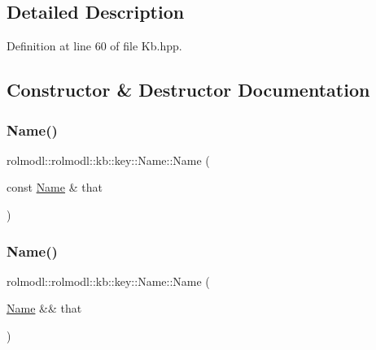 \subsection{Detailed Description}


Definition at line 60 of file Kb.\+hpp.



\subsection{Constructor \& Destructor Documentation}
\mbox{\label{structrolmodl_1_1rolmodl_1_1kb_1_1key_1_1_name_a7811719d33231a58b4f5c690c213a5f6}} 
\subsubsection{\texorpdfstring{Name()}{Name()}\hspace{0.1cm}{\footnotesize\ttfamily [1/2]}}
{\footnotesize\ttfamily rolmodl\+::rolmodl\+::kb\+::key\+::\+Name\+::\+Name (\begin{DoxyParamCaption}\item[{const \mbox{\hyperlink{structrolmodl_1_1rolmodl_1_1kb_1_1key_1_1_name}{Name}} \&}]{that }\end{DoxyParamCaption})\hspace{0.3cm}{\ttfamily [delete]}}

\mbox{\label{structrolmodl_1_1rolmodl_1_1kb_1_1key_1_1_name_a1821e19c6e10dc3645bad07e7bf54a6b}} 
\subsubsection{\texorpdfstring{Name()}{Name()}\hspace{0.1cm}{\footnotesize\ttfamily [2/2]}}
{\footnotesize\ttfamily rolmodl\+::rolmodl\+::kb\+::key\+::\+Name\+::\+Name (\begin{DoxyParamCaption}\item[{\mbox{\hyperlink{structrolmodl_1_1rolmodl_1_1kb_1_1key_1_1_name}{Name}} \&\&}]{that }\end{DoxyParamCaption})\hspace{0.3cm}{\ttfamily [delete]}}



